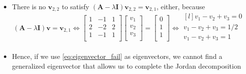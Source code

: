 \documentclass[12pt,a4paper]{article}
\begin{document}
\begin{itemize}
\begin{itemize}
\begin{itemize}
    \item There is no $\bm{v}_{2,2}$ to satisfy $(\bm{A}-\lambda \bm{I})\bm{v}_{2,2}=\bm{v}_{2,1}$, either, because
      \begin{equation}\nonumber%
        (\bm{A}-\lambda \bm{I})\bm{v} = \bm{v}_{2,1}
        \iff
      \begin{bmatrix}
        1 & -1 & 1 \\
        2 & -2 & 2 \\
        1 & -1 & 1 \\
      \end{bmatrix}
      \begin{bmatrix}
        v_{1} \\
        v_{2} \\
        v_{3} \\
      \end{bmatrix}
      =
      \begin{bmatrix}
        0 \\
        1 \\
        1 \\
      \end{bmatrix}
      \iff
      \begin{matrix*}[l]
      v_{1} - v_{2} + v_{3} = 0 \\
      v_{1} - v_{2} + v_{3} = 1/2 \\
      v_{1} - v_{2} + v_{3} = 1 \\
      \end{matrix*}
      \end{equation}

    \item Hence, if we use \eqref{eq:eigenvector_fail} as eigenvectors,
      we cannot find a generalized eigenvector that allows us to complete the Jordan decomposition
    \end{itemize}


\end{itemize}
\end{itemize}
\end{document}
